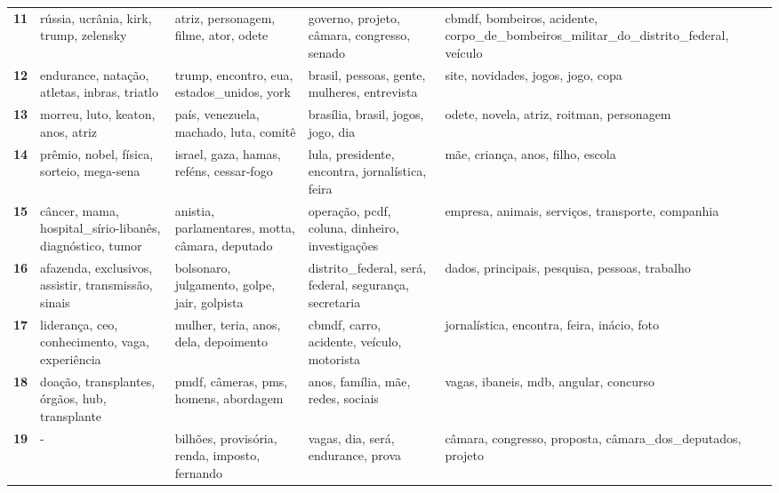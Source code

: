 \begin{xltabular}{\textwidth}{@{}l >{\RaggedRight\arraybackslash}X >{\RaggedRight\arraybackslash}X >{\RaggedRight\arraybackslash}X >{\RaggedRight\arraybackslash}X@{}}
    \textbf{11} & rússia, ucrânia, kirk, trump, zelensky & atriz, personagem, filme, ator, odete & governo, projeto, câmara, congresso, senado & cbmdf, bombeiros, acidente, corpo\_de\_bombeiros\_militar\_do\_distrito\_federal, veículo \\
    \textbf{12} & endurance, natação, atletas, inbras, triatlo & trump, encontro, eua, estados\_unidos, york & brasil, pessoas, gente, mulheres, entrevista & site, novidades, jogos, jogo, copa \\
    \textbf{13} & morreu, luto, keaton, anos, atriz & país, venezuela, machado, luta, comitê & brasília, brasil, jogos, jogo, dia & odete, novela, atriz, roitman, personagem \\
    \textbf{14} & prêmio, nobel, física, sorteio, mega-sena & israel, gaza, hamas, reféns, cessar-fogo & lula, presidente, encontra, jornalística, feira & mãe, criança, anos, filho, escola \\
    \textbf{15} & câncer, mama, hospital\_sírio-libanês, diagnóstico, tumor & anistia, parlamentares, motta, câmara, deputado & operação, pcdf, coluna, dinheiro, investigações & empresa, animais, serviços, transporte, companhia \\
    \textbf{16} & afazenda, exclusivos, assistir, transmissão, sinais & bolsonaro, julgamento, golpe, jair, golpista & distrito\_federal, será, federal, segurança, secretaria & dados, principais, pesquisa, pessoas, trabalho \\
    \textbf{17} & liderança, ceo, conhecimento, vaga, experiência & mulher, teria, anos, dela, depoimento & cbmdf, carro, acidente, veículo, motorista & jornalística, encontra, feira, inácio, foto \\
    \textbf{18} & doação, transplantes, órgãos, hub, transplante & pmdf, câmeras, pms, homens, abordagem & anos, família, mãe, redes, sociais & vagas, ibaneis, mdb, angular, concurso \\
    \textbf{19} & - & bilhões, provisória, renda, imposto, fernando & vagas, dia, será, endurance, prova & câmara, congresso, proposta, câmara\_dos\_deputados, projeto \\
\end{xltabular}
\endgroup
